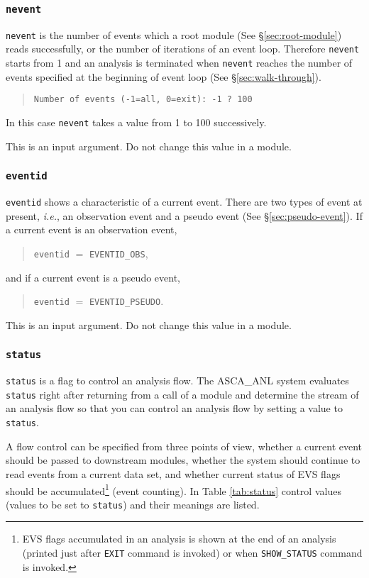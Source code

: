 \subsubsection{\tt nevent}
{\tt nevent} is the number of events
which a root module (See \S \ref{sec:root-module}) reads successfully,
or the number of iterations of an event loop.
Therefore
{\tt nevent} starts from 1 and an analysis is terminated
when {\tt nevent} reaches the number of events
specified at the beginning of event loop (See \S \ref{sec:walk-through}).
\begin{quote}\baselineskip 3.2mm\begin{verbatim}
Number of events (-1=all, 0=exit): -1 ? 100
\end{verbatim}\end{quote}
In this case
{\tt nevent} takes a value from 1 to 100 successively.

This is an input argument.
Do not change this value in a module.

\subsubsection{\tt eventid}
{\tt eventid} shows a characteristic of a current event.
There are two types of event at present,
{\em i.e.},
an observation event and a pseudo event (See \S \ref{sec:pseudo-event}).
If a current event is an observation event,
\begin{quote}
  {\tt eventid} $=$ {\tt EVENTID\_OBS},
\end{quote}
and if a current event is a pseudo event,
\begin{quote}
  {\tt eventid} $=$ {\tt EVENTID\_PSEUDO}.
\end{quote}

This is an input argument.
Do not change this value in a module.

\subsubsection{\tt status}
{\tt status} is a flag to control an analysis flow.
The ASCA\_ANL system evaluates {\tt status}
right after returning from a call of a module
and determine the stream of an analysis flow
so that you can control an analysis flow by setting a value to {\tt status}.

A flow control can be specified from three points of view,
whether a current event should be passed to downstream modules,
whether the system should continue to read events from a current data set,
and whether current status of EVS flags should be accumulated\footnote{
EVS flags accumulated in an analysis is shown at the end of an analysis
(printed just after {\tt EXIT} command is invoked)
or when {\tt SHOW\_STATUS} command is invoked.} (event counting).
In Table \ref{tab:status}
control values (values to be set to {\tt status})
and their meanings are listed.

